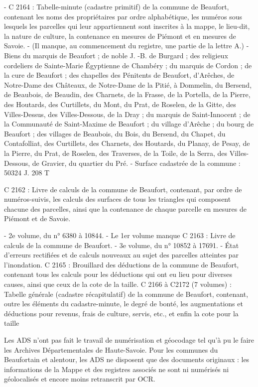\documentclass[12pt,a4paper]{report}
\begin{document}
- C 2164 : Tabelle-minute (cadastre primitif) de la commune de Beaufort, contenant les noms des propriétaires par ordre alphabétique, les numéros sous lesquels les parcelles qui leur appartiennent sont inscrites à la mappe, le lieu-dit, la nature de culture, la contenance en mesures de Piémont et en mesures de Savoie. - (Il manque, au commencement du registre, une partie de la lettre A.) - Biens du marquis de Beaufort ; de noble J. -B. de Burgard ; des religieux cordeliers de Sainte-Marie Égyptienne de Chambéry ; du marquis de Cordon ; de la cure de Beaufort ; des chapelles des Pénitents de Beaufort, d’Arêches, de Notre-Dame des Châteaux, de Notre-Dame de la Pitié, à Dommelin, du Bersend, de Beaubois, de Beaudin, des Charnets, de la Frasse, de la Portella, de la Pierre, des Houtards, des Curtillets, du Mont, du Prat, de Roselen, de la Gitte, des Villes-Dessus, des Villes-Dessous, de la Dray ; du marquis de Saint-Innocent ; de la Communauté de Saint-Maxime de Beaufort ; du village d’Arêche ; du bourg de Beaufort ; des villages de Beaubois, du Bois, du Bersend, du Chapet, du Contafolliat, des Curtillets, des Charnets, des Houtards, du Planay, de Pesay, de la Pierre, du Prat, de Roselen, des Traverses, de la Toile, de la Serra, des Villes-Dessous, de Gravier, du quartier du Pré. - Surface cadastrée de la commune : 50324 J. 208 T

C 2162 : Livre de calculs de la commune de Beaufort, contenant, par ordre de numéros-suivis, les calculs des surfaces de tous les triangles qui composent chacune des parcelles, ainsi que la contenance de chaque parcelle en mesures de Piémont et de Savoie.

- 2e volume, du n° 6380 à 10844. - Le 1er volume manque
C 2163 : Livre de calculs de la commune de Beaufort. - 3e volume, du n° 10852 à 17691. - État d’erreurs rectifiées et de calculs nouveaux au sujet des parcelles atteintes par l’inondation.
C 2165 : Brouillard des déductions de la commune de Beaufort, contenant tous les calculs pour les déductions qui ont eu lieu pour diverses causes, ainsi que ceux de la cote de la taille.
C 2166 à C2172 (7 volumes) : Tabelle générale (cadastre récapitulatif) de la commune de Beaufort, contenant, outre les éléments du cadastre-minute, le degré de bonté, les augmentations et déductions pour revenus, frais de culture, servis, etc., et enfin la cote pour la taille



Les ADS n’ont pas fait le travail de numérisation et géocodage tel qu’à pu le faire les Archives Départementales de Haute-Savoie. Pour les communes du Beaufortain et alentour, les ADS ne disposent que des documents originaux : les informations de la Mappe et des registres associés ne sont ni numérisés ni géolocalisés et encore moins retranscrit par OCR.
\end{document}

